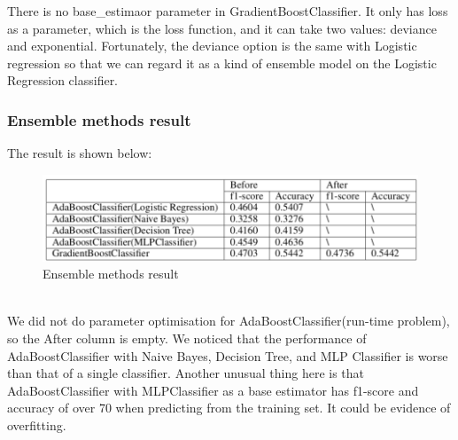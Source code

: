 \documentclass{article}
\begin{document}
There is no base\_estimaor parameter in GradientBoostClassifier. It only has loss as a parameter, which is the loss function, and it can take two values: deviance and exponential. Fortunately, the deviance option is the same with Logistic regression so that we can regard it as a kind of ensemble model on the Logistic Regression classifier.

\subsubsection{Ensemble methods result}
The result is shown below:\\
\begin{figure}[ht]
\centering
\includegraphics[scale=1]{graphs/ensemble_result_table.png}
\caption{Ensemble methods result}
\label{fig:confusion_matrix}
\end{figure}\\
We did not do parameter optimisation for AdaBoostClassifier(run-time problem), so the After column is empty. We noticed that the performance of AdaBoostClassifier with Naive Bayes, Decision Tree, and MLP Classifier is worse than that of a single classifier. Another unusual thing here is that AdaBoostClassifier with MLPClassifier as a base estimator has f1-score and accuracy of over 70 when predicting from the training set. It could be evidence of overfitting.
\end{document}

